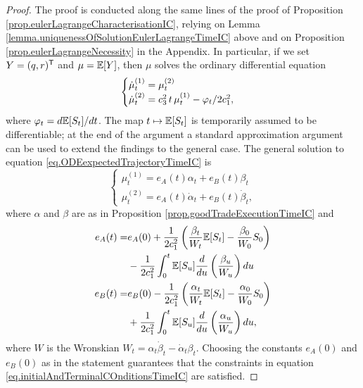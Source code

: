 \documentclass[10pt,a4paper]{article}
\begin{document}
	\begin{proof}
		The proof is conducted along the same lines of the proof of Proposition \ref{prop.eulerLagrangeCharacterisationIC}, relying  on Lemma \ref{lemma.uniquenessOfSolutionEulerLagrangeTimeIC} above and on Proposition \ref{prop.eulerLagrangeNecessity} in the Appendix. In particular, if we set $Y=(q,r)^{\mathsf{T}}$ and $\mu=\mathbb{{E}}[Y]$, then $\mu$ solves the ordinary differential equation 
		\begin{equation}\label{eq.ODEexpectedTrajectoryTimeIC}
		\begin{cases}
		\dot{\mu}^{(1)}_t = \mu^{(2)}_t \\
		\dot{\mu}^{(2)}_t = c_{3}^{2} \, t \, \mu^{(1)}_t - \varphi_t/2c_{1}^{2},
		\end{cases}
		\end{equation}
		where $\varphi_t=d\mathbb{{E}}[S_t]/dt$. The map $t\mapsto \mathbb{{E}}[S_t]$ is temporarily assumed to be differentiable; at the end of the argument a standard approximation argument can be used to extend the findings to the general case. The general solution to equation \eqref{eq.ODEexpectedTrajectoryTimeIC} is 
		\begin{equation*}
		\begin{cases}
		\mu^{(1)}_t = e_A (t)\alpha_t + e_B(t)\beta_t \\
		\mu^{(2)}_t = e_A(t)\dot{\alpha}_t + e_B(t)\dot{\beta}_t,
		\end{cases}
		\end{equation*}
		where $\alpha$ and $\beta$ are as in Proposition \ref{prop.goodTradeExecutionTimeIC} and
		\begin{equation*}
		\begin{split}
		e_A(t) = & 
		e_A(0) + \frac{1}{2c_{1}^{2}} \left(\frac{\beta_t}{W_t} \mathbb{{E}}[S_t] - \frac{\beta_0}{W_0}S_0\right) \\
		& -\frac{1}{2c_{1}^{2}}\int_{0}^{t} \mathbb{{E}}[S_u]\frac{d}{du}\left(\frac{\beta_u}{W_u}\right)du\\
		e_B(t) = & 
		e_B(0) - \frac{1}{2c_{1}^{2}} \left(\frac{\alpha_t}{W_t} \mathbb{{E}}[S_t] - \frac{\alpha_0}{W_0}S_0\right) \\
		& +\frac{1}{2c_{1}^{2}}\int_{0}^{t} \mathbb{{E}}[S_u]\frac{d}{du}\left(\frac{\alpha_u}{W_u}\right)du,
		\end{split}
		\end{equation*}
		where $W$ is the Wronskian $W_t = \alpha_t\dot{\beta}_t - \dot{\alpha}_t \beta_t$. Choosing the constants $e_A(0)$ and $e_B(0)$ as in the statement guarantees that the constraints in equation \eqref{eq.initialAndTerminalCOnditionsTimeIC} are satisfied. 
	\end{proof}
\end{document}
